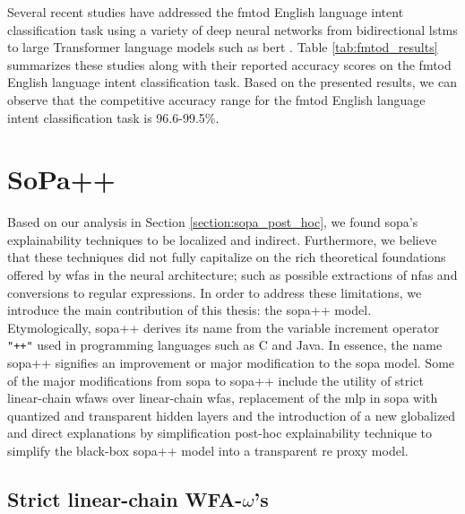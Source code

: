 \label{section:fmtod_performance}

Several recent studies have addressed the \ac{fmtod} English language intent
classification task using a variety of deep neural networks from bidirectional
\ac{lstm}s to large Transformer language models such as \ac{bert}
\citep{schuster-etal-2019-cross-lingual,zhang2019joint,zhang-etal-2020-intent}.
Table \ref{tab:fmtod_results} summarizes these studies along with their reported
accuracy scores on the \ac{fmtod} English language intent classification task.
Based on the presented results, we can observe that the competitive accuracy
range for the \ac{fmtod} English language intent classification task is
96.6-99.5$\%$.

\section{SoPa++}

Based on our analysis in Section \ref{section:sopa_post_hoc}, we found \ac{sopa}'s
explainability techniques to be localized and indirect. Furthermore, we believe
that these techniques did not fully capitalize on the rich theoretical
foundations offered by \ac{wfas} in the neural architecture; such as possible
extractions of \ac{nfas} and conversions to regular expressions. In order to
address these limitations, we introduce the main contribution of this thesis:
the \ac{sopa}++ model. Etymologically, \ac{sopa}++ derives its name from the variable
increment operator \texttt{"++"} used in programming languages such as C and
Java. In essence, the name \ac{sopa}++ signifies an improvement or major modification
to the \ac{sopa} model. Some of the major modifications from \ac{sopa} to \ac{sopa}++ include
the utility of strict linear-chain \ac{wfaws} over linear-chain \ac{wfas},
replacement of the \ac{mlp} in \ac{sopa} with quantized and transparent hidden layers
and the introduction of a new globalized and direct explanations by
simplification post-hoc explainability technique to simplify the black-box
\ac{sopa}++ model into a transparent \ac{re} proxy model.

\subsection{Strict linear-chain WFA-$\omega$'s}

